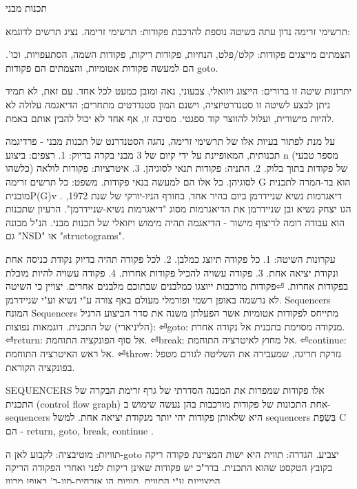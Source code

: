 \begin{טבלא}[!htbp]
        תכנות מבני

        תרשימי זרימה
        נדון עתה בשיטה נוספת להרכבת פקודות: תרשימי זרימה. נציג תרשים לדוגמא:

        הצמתים מייצגים פקודות: קלט/פלט, הנחיות, פקודות ריקות, פקודות השמה, הסתעפויות, וכו'. הם למעשה פקודות אטומיות, והצמתים הם פקודות goto.

        יתרונות שיטה זו ברורים: הייצוג ויזואלי, צבעוני, נאה ומובן כמעט לכל אחד. עם זאת, לא תמיד ניתן לבצע לשיטה זו סטנדרטיזציה, וישנם המון סטנדרטים מתחרים; הדיאגמה עלולה לא להיות מישורית, ועלול להווצר קוד ספגטי. מסיבה זו, אף אחד לא יכול להבין אותם באמת.

        על מנת לפתור בעיות אלו של תרשימי זרימה, נהגה הסטנדרנט של תכנות מבני - פרדיגמה תכנותית, המאופיינת על ידי קיום של 3 מבני בקרה בדיוק:
        1. רצפים: ביצוע n (מספר טבעי כלשהו) של פקודות בתוך בלוק.
        2. התניה: פקודות תנאי לסוגיהן.
        3. איטרציות: פקודות לולאה לסוגיהן.
        כל אלו הם למעשה בנאי פקודות.
        משפט: כל תרשים זרימה G הוא בר-המרה לתכנית מובניתP(G)v .
        דיאגרמות נשיא שניידרמן
        ביום בהיר אחד, בחורף הניו-יורקי של שנת 1972, הגו יצחק נשיא ובן שניידרמן את הדיאגרמות מסוג "דיאגרמות נשיא-שניידרמן". הרעיון שתכנות הוא עבודה דומה לריצוף מישור - הדיאגמה תהיה מימוש ויזואלי של תכנות מבני. הנ"ל מכונה גם "NSD" או "structograms".

        עקרונות השיטה:
        1. כל פקודה תיוצג כמלבן.
        2. לכל פקודה תהיה בדיוק נקודת כניסה אחת ונקודת יציאה אחת.
        3. פקודה עשויה להכיל פקודות אחרות.
        4. פקודה עשויה להיות מוכלת בפקודות אחרות.
⏎פקודות מורכבות ייוצגו כמלבנים שבתוכם מלבנים אחרים.
        יצויין כי השיטה לא נרשמה באופן רשמי ופורמלי מעולם באף צורה ע"י נשיא וע"י שניידרמן.
        Sequencers
        המונח Sequencers מתייחס לפקודות אטומיות אשר הפעלתן משנה את סדר הביצוע הרגיל (הליניארי) של התכנית.
        דוגמאות נפוצות:
⏎goto: מנקודה מסוימת בתכנית אל נקודה אחרת.
⏎return: אל סוף הפונקציה התוחמת.
⏎break: אל מחוץ לאיטרציה התוחמת.
⏎continue: אל ראש האיטרציה התוחמת.
⏎throw: נזרקת חריגה, שמעבירה את השליטה לגורם מטפל בפונקציה הקוראת.

        SEQUENCERS
        אלו פקודות שמפרות את המבנה הסדרתי של גרף זרימת הבקרה של התכנית
        (control flow graph) אחת התכונות של פקודות מורכבות בהן נעשה שימוש ב-sequencers היא שלאותן פקודות יהי יותר מנקודת יציאה אחת.
        למשל sequencers בִּשְׂפַת C הם - return, goto, break, continue .

        תוויות:
        מוטיבציה: לקבוע לאן ה-goto יצביע.
        הגדרה: תווית היא ישות המציינת פקודה ריקה בקובץ הטקסט שהוא התכנית. בדר"כ יש פקודות שאינן ריקות לפני ואחרי הפקודה הריקה המצויינת ע"י התווית.
        תוויות הן אזרחים-סוג-ב' באופן מכוון.


\end{טבלא}

